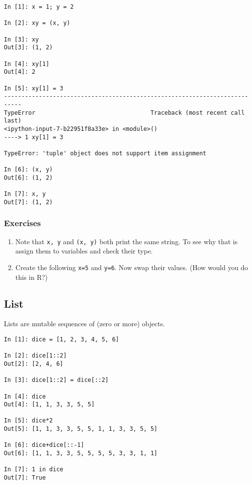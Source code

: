 \begin{verbatim}
In [1]: x = 1; y = 2

In [2]: xy = (x, y)

In [3]: xy
Out[3]: (1, 2)

In [4]: xy[1]
Out[4]: 2

In [5]: xy[1] = 3
---------------------------------------------------------------------------
TypeError                                 Traceback (most recent call last)
<ipython-input-7-b22951f8a33e> in <module>()
----> 1 xy[1] = 3

TypeError: 'tuple' object does not support item assignment

In [6]: (x, y)
Out[6]: (1, 2)

In [7]: x, y
Out[7]: (1, 2)
\end{verbatim}

\subsubsection{Exercises}
\begin{enumerate}
\item Note that \texttt{x, y} and \texttt{(x, y)} both print the same string.
  To see why that is assign them to variables and check their type.
\item Create the following \texttt{x=5} and \texttt{y=6}. Now swap their values.
  (How would you do this in R?)
\end{enumerate}

\subsection{List}

Lists are mutable sequences of (zero or more) objects.

\begin{verbatim}
In [1]: dice = [1, 2, 3, 4, 5, 6]

In [2]: dice[1::2]
Out[2]: [2, 4, 6]

In [3]: dice[1::2] = dice[::2]

In [4]: dice
Out[4]: [1, 1, 3, 3, 5, 5]

In [5]: dice*2
Out[5]: [1, 1, 3, 3, 5, 5, 1, 1, 3, 3, 5, 5]

In [6]: dice+dice[::-1]
Out[6]: [1, 1, 3, 3, 5, 5, 5, 5, 3, 3, 1, 1]

In [7]: 1 in dice
Out[7]: True
\end{verbatim}

